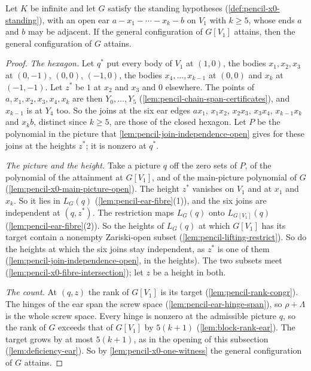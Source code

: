 \begin{theorem}
  \label{thm:pencil-x0-open-ear}
  \leanok
  Let $K$ be infinite and let $G$ satisfy the standing hypotheses
  (\cref{def:pencil-x0-standing}), with an open ear
  $a - x_1 - \cdots - x_k - b$ on $V_1$ with $k \ge 5$, whose ends $a$
  and $b$ may be adjacent. If the general configuration of $G[V_1]$
  attains, then the general configuration of $G$ attains.
\end{theorem}
\begin{proof}
  \leanok
  \emph{The hexagon.} Let $q^*$ put every body of $V_1$ at $(1, 0)$, the
  bodies $x_1, x_2, x_3$ at $(0, -1)$, $(0, 0)$, $(-1, 0)$, the bodies
  $x_4, \dots, x_{k-1}$ at $(0, 0)$ and $x_k$ at $(-1, -1)$. Let $z^*$ be
  $1$ at $x_2$ and $x_3$ and $0$ elsewhere. The points of
  $a, x_1, x_2, x_3, x_4, x_k$ are then $Y_0, \dots, Y_5$
  (\cref{lem:pencil-chain-span-certificates}), and $x_{k-1}$ is at $Y_4$
  too. So the joins at the six ear edges $a x_1$, $x_1 x_2$, $x_2 x_3$,
  $x_3 x_4$, $x_{k-1} x_k$ and $x_k b$, distinct since $k \ge 5$, are
  those of the closed hexagon. Let $P$ be the polynomial in the picture
  that \cref{lem:pencil-join-independence-open} gives for these joins at
  the heights $z^*$; it is nonzero at $q^*$.

  \emph{The picture and the height.} Take a picture $q$ off the zero sets
  of $P$, of the polynomial of the attainment at $G[V_1]$, and of the
  main-picture polynomial of $G$ (\cref{lem:pencil-x0-main-picture-open}).
  The height $z^*$ vanishes on $V_1$ and at $x_1$ and $x_k$. So it lies
  in $L_G(q)$ (\cref{lem:pencil-ear-fibre}(1)), and the six joins are
  independent at $(q, z^*)$. The restriction maps $L_G(q)$ onto
  $L_{G[V_1]}(q)$ (\cref{lem:pencil-ear-fibre}(2)). So the heights of
  $L_G(q)$ at which $G[V_1]$ has its target contain a nonempty
  Zariski-open subset (\cref{lem:pencil-lifting-restrict}). So do the
  heights at which the six joins stay independent, as $z^*$ is one of
  them (\cref{lem:pencil-join-independence-open}, in the heights). The two
  subsets meet (\cref{lem:pencil-x0-fibre-intersection}); let $z$ be a
  height in both.

  \emph{The count.} At $(q, z)$ the rank of $G[V_1]$ is its target
  (\cref{lem:pencil-rank-congr}). The hinges of the ear span the screw
  space (\cref{lem:pencil-ear-hinge-span}), so $\rho + \Lambda$ is the
  whole screw space. Every hinge is nonzero at the admissible picture
  $q$, so the rank of $G$ exceeds that of $G[V_1]$ by $5(k + 1)$
  (\cref{lem:block-rank-ear}). The target grows by at most $5(k + 1)$, as
  in the opening of this subsection (\cref{lem:deficiency-ear}). So by
  \cref{lem:pencil-x0-one-witness} the general configuration of $G$
  attains.
\end{proof}

